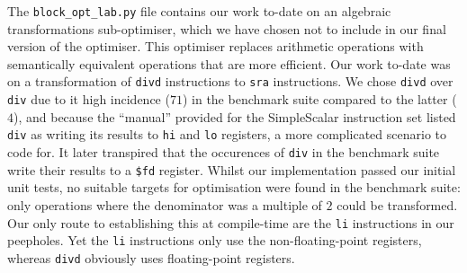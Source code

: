 The \texttt{block\_opt\_lab.py} file contains our work to-date on an algebraic
transformations sub-optimiser, which we have chosen not to include in our final
version of the optimiser. This optimiser replaces arithmetic operations with
semantically equivalent operations that are more efficient. Our work to-date was
on a transformation of \texttt{divd} instructions to \texttt{sra} instructions.
We chose \texttt{divd} over \texttt{div} due to it high incidence ($71$) in the
benchmark suite compared to the latter ($4$), and because the ``manual''
provided for the SimpleScalar instruction set listed \texttt{div} as writing its
results to \texttt{hi} and \texttt{lo} registers, a more complicated scenario to
code for. It later transpired that the occurences of \texttt{div} in the
benchmark suite write their results to a \texttt{\$fd} register.  Whilst our
implementation passed our initial unit tests, no suitable targets for
optimisation were found in the benchmark suite: only operations where the
denominator was a multiple of $2$ could be transformed. Our only route to
establishing this at compile-time are the \texttt{li} instructions in our
peepholes. Yet the \texttt{li} instructions only use the non-floating-point
registers, whereas \texttt{divd} obviously uses floating-point registers.
